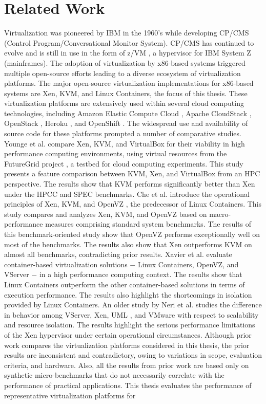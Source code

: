 \chapter{Related Work}

Virtualization was pioneered by IBM in the 1960's while developing CP/CMS (Control Program/Conversational Monitor System). CP/CMS has continued to evolve and is still in use in the form of z/VM \cite{zvm}, a hypervisor for IBM System Z (mainframes). The adoption of virtualization by x86-based systems triggered multiple open-source efforts leading to a diverse ecosystem of virtualization platforms. The major open-source virtualization implementations for x86-based systems are Xen, KVM, and Linux Containers, the focus of this thesis. These virtualization platforms are extensively used within several cloud computing technologies, including Amazon Elastic Compute Cloud \cite{ec2}, Apache CloudStack \cite{cloudstack}, OpenStack \cite{openstack}, Heroku \cite{heroku}, and OpenShift \cite{openshift}. The widespread use and availability of source code for these platforms prompted a number of comparative studies. Younge et al. \cite{younge2011analysis} compare Xen, KVM, and VirtualBox \cite{virtualbox} for their viability in high performance computing environments, using virtual resources from the FutureGrid project \cite{futuregrid}, a testbed for cloud computing experiments. This study presents a feature comparison between KVM, Xen, and VirtualBox from an HPC perspective. The results show that KVM performs significantly better than Xen under the HPCC \cite{hpcc} and SPEC \cite{spec} benchmarks. Che et al. \cite{synthetic} introduce the operational principles of Xen, KVM, and OpenVZ \cite{openvz}, the predecessor of Linux Containers. This study compares and analyzes Xen, KVM, and OpenVZ based on macro-performance measures comprising standard system benchmarks. The results of this benchmark-oriented study show that OpenVZ performs exceptionally well on most of the benchmarks. The results also show that Xen outperforms KVM on almost all benchmarks, contradicting prior results. Xavier et al. \cite{container1} evaluate container-based virtualization solutions $-$ Linux Containers, OpenVZ, and VServer \cite{vserver} $-$ in a high performance computing context. The results show that Linux Containers outperform the other container-based solutions in terms of execution performance. The results also highlight the shortcomings in isolation provided by Linux Containers. An older study by Neri et al. \cite{fourcomp} studies the difference in behavior among VServer, Xen, UML \cite{uml}, and VMware \cite{vmware} with respect to scalability and resource isolation. The results highlight the serious performance limitations of the Xen hypervisor under certain operational circumstances. Although prior work compares the virtualization platforms considered in this thesis, the prior results are inconsistent and contradictory, owing to variations in scope, evaluation criteria, and hardware. Also, all the results from prior work are based only on synthetic micro-benchmarks that do not necessarily correlate with the performance of practical applications. This thesis evaluates the performance of representative virtualization platforms for 